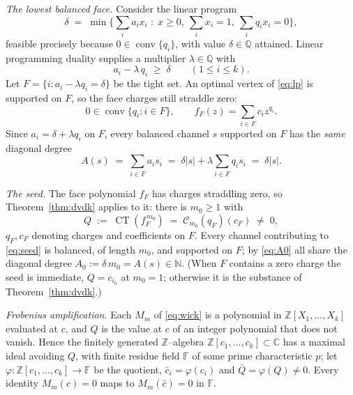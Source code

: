 \documentclass[11pt,reqno]{amsart}
\theoremstyle{plain}
\theoremstyle{definition}
\newcommand{\C}{\mathbb{C}}
\newcommand{\Z}{\mathbb{Z}}
\newcommand{\Q}{\mathbb{Q}}
\newcommand{\N}{\mathbb{N}}
\newcommand{\CT}{\operatorname{CT}}
\begin{document}
\smallskip\noindent\emph{The lowest balanced face.} Consider the linear program
\begin{equation}\label{eq:lp}
  \delta\;=\;\min\Big\{\textstyle\sum_i a_i x_i\;:\;x\ge0,\ \textstyle\sum_i x_i=1,\ \textstyle\sum_i q_i x_i=0\Big\},
\end{equation}
feasible precisely because $0\in\operatorname{conv}\{q_i\}$, with value $\delta\in\Q$ attained. Linear
programming duality supplies a multiplier $\lambda\in\Q$ with
\begin{equation}\label{eq:dual}
  a_i-\lambda\,q_i\;\ge\;\delta\qquad(1\le i\le k).
\end{equation}
Let $F=\{i:a_i-\lambda q_i=\delta\}$ be the tight set. An optimal vertex of \eqref{eq:lp} is supported on
$F$, so the face charges still straddle zero:
\begin{equation}\label{eq:face}
  0\in\operatorname{conv}\{q_i:i\in F\},\qquad f_F(z)=\sum_{i\in F} c_i z^{q_i}.
\end{equation}
Since $a_i=\delta+\lambda q_i$ on $F$, every balanced channel $s$ supported on $F$ has the \emph{same}
diagonal degree
\begin{equation}\label{eq:A0}
  A(s)\;=\;\sum_{i\in F} a_i s_i\;=\;\delta|s|+\lambda\!\sum_{i\in F} q_i s_i\;=\;\delta|s|.
\end{equation}

\smallskip\noindent\emph{The seed.} The face polynomial $f_F$ has charges straddling zero, so
Theorem~\ref{thm:dvdk} applies to it: there is $m_0\ge1$ with
\begin{equation}\label{eq:seed}
  Q\;:=\;\CT(f_F^{\,m_0})\;=\;\mathcal C_{m_0}(q_F)(c_F)\;\ne\;0,
\end{equation}
$q_F,c_F$ denoting charges and coefficients on $F$. Every channel contributing to \eqref{eq:seed} is
balanced, of length $m_0$, and supported on $F$; by \eqref{eq:A0} all share the diagonal degree
$A_0:=\delta\,m_0=A(s)\in\N$. (When $F$ contains a zero charge the seed is immediate, $Q=c_{i_0}$ at
$m_0=1$; otherwise it is the substance of Theorem~\ref{thm:dvdk}.)

\smallskip\noindent\emph{Frobenius amplification.} Each $M_m$ of \eqref{eq:wick} is a polynomial in
$\Z[X_1,\dots,X_k]$ evaluated at $c$, and $Q$ is the value at $c$ of an integer polynomial that does not
vanish. Hence the finitely generated $\Z$--algebra $\Z[c_1,\dots,c_k]\subset\C$ has a maximal ideal
avoiding $Q$, with finite residue field $\mathbb F$ of some prime characteristic $p$; let
$\varphi\colon\Z[c_1,\dots,c_k]\to\mathbb F$ be the quotient, $\bar c_i=\varphi(c_i)$ and
$\bar Q=\varphi(Q)\ne0$. Every identity $M_m(c)=0$ maps to $M_m(\bar c)=0$ in $\mathbb F$.
\end{document}
